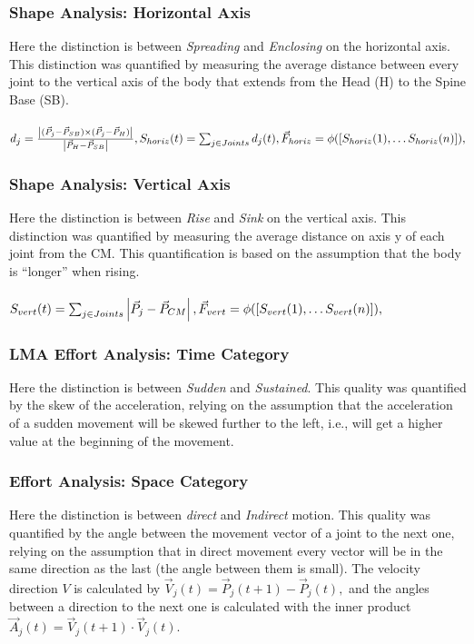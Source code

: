 \documentclass[11pt,twocolumn,varwidth=true,a4paper,fleqn]{article}
\begin{document}
\subsubsection{Shape Analysis: Horizontal Axis}
Here the distinction is between \textit{Spreading} and \textit{Enclosing} on the horizontal axis.
This distinction was quantified by measuring the average distance between every joint to 
the vertical axis of the body that extends from the Head (H) to the Spine Base (SB).
\\
\\$d_{j} = \frac{\left|(\vec{P}_{j}-\vec{P}_{SB})\times
(\vec{P}_{j}-\vec{P}_{H})\right|}{\left|\vec{P}_{H}-\vec{P}_{SB}\right|},
\\
\\S_{horiz}(t) = \sum_{j \in Joints} d_{j}(t),
\\
\\\vec{F}_{horiz} = \phi([S_{horiz}(1), \ldots S_{horiz}(n)]),$
\subsubsection{Shape Analysis: Vertical Axis}
Here the distinction is between \textit{Rise} and \textit{Sink} on the vertical
axis.
This distinction was quantified by measuring the average distance on axis y of each joint from the CM. This quantification is based on the assumption that the body
is ``longer'' when rising.
\\\\$S_{vert}(t) = \sum_{j \in Joints}
\left|\vec{P}_{j}-\vec{P}_{CM}\right|,
\\\\\vec{F}_{vert} = \phi([S_{vert}(1), \ldots S_{vert}(n)]),$
\subsubsection{LMA Effort Analysis: Time Category}
Here the distinction is between \textit{Sudden} and \textit{Sustained}. This quality was quantified by the skew of the acceleration, relying on the assumption that the
acceleration of a sudden movement will be skewed further to the left, i.e., will get
a higher value at the beginning of the movement.
\subsubsection{Effort Analysis: Space Category}
Here the distinction is between \textit{direct} and \textit{Indirect} motion.
This quality was quantified by the angle between the movement vector of a joint to the next one,
relying on the assumption that in direct movement every vector will be in
the same direction as the last (the angle between them is small).
The velocity direction $V$ is calculated by
$\vec{V}_{j}(t) = \vec{P}_{j}(t+1) - \vec{P}_{j}(t),$
and the angles between a direction to the next one is calculated with the inner product
$\vec{A}_{j}(t) = \vec{V}_{j}(t+1) \cdot \vec{V}_{j}(t).$
\end{document}
